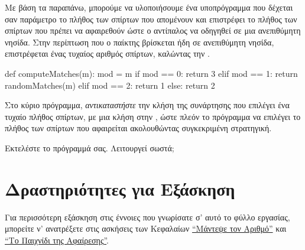 \documentclass[a4paper,11pt,oneside]{book}
\begin{document}
\begin{step}
Με βάση τα παραπάνω, μπορούμε να υλοποιήσουμε ένα υποπρόγραμμα που δέχεται σαν παράμετρο το πλήθος  των σπίρτων που απομένουν και επιστρέφει το πλήθος των σπίρτων που πρέπει να αφαιρεθούν ώστε ο αντίπαλος να οδηγηθεί σε μια ανεπιθύμητη νησίδα. Στην περίπτωση που ο παίκτης βρίσκεται ήδη σε ανεπιθύμητη νησίδα, επιστρέφεται ένας τυχαίος αριθμός σπίρτων, καλώντας την . 

\begin{pycode}
def computeMatches(m):
    mod = m %
    if mod == 0:
        return 3
    elif mod == 1:
        return randomMatches(m)
    elif mod == 2:
        return 1  
    else:
        return 2
\end{pycode}
\end{step}

\begin{step}
Στο κύριο πρόγραμμα, \emph{αντικαταστήστε} την κλήση της συνάρτησης  που επιλέγει ένα τυχαίο πλήθος σπίρτων, με μια κλήση στην , ώστε πλεόν το πρόγραμμα να επιλέγει το πλήθος των σπίρτων που αφαιρείται ακολουθώντας συγκεκριμένη στρατηγική.

Εκτελέστε το πρόγραμμά σας. Λειτουργεί σωστά;

\marginnote[14pt]{\icondiscuss}
\dottedline
\end{step}

\section{Δραστηριότητες για Εξάσκηση}

%
Για περισσότερη εξάσκηση στις έννοιες που γνωρίσατε σ' αυτό το φύλλο εργασίας, μπορείτε ν' ανατρέξετε στις ασκήσεις των %
Κεφαλαίων \href{http://pythonies.mysch.gr/chapters/guess.pdf}{``Μάντεψε τον Αριθμό''} και \href{http://pythonies.mysch.gr/chapters/nim.pdf}{``Το Παιχνίδι της Αφαίρεσης''}.
\end{document}

